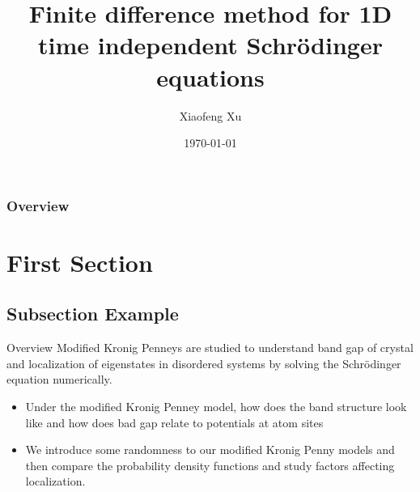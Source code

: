 \documentclass{beamer}
\title[Short title]{Finite difference method for 1D time independent Schr\"{o}dinger equations } %
\author{Xiaofeng Xu} %
\institute[HKUST] %
{
Hong Kong University of Science and Technology \\ %
\medskip
\textit{xxuam@connect.ust.hk} %
}
\date{\today} %
\begin{document}
\begin{frame}
\titlepage %
\end{frame}

\begin{frame}
\frametitle{Overview} %
\tableofcontents %
\end{frame}


\section{First Section} %

\subsection{Subsection Example} %
\begin{frame}{Overview}
Modified Kronig Penneys are studied to understand band gap of crystal and localization of eigenstates in disordered systems by solving the Schr\"{o}dinger equation numerically. 
\begin{itemize}
    \item Under the modified Kronig Penney model, how does the band structure look like and how does bad gap relate to potentials at atom sites
    \item We introduce some randomness to our modified Kronig Penny models and then compare the probability density functions and study factors affecting localization. 
\end{itemize}
\end{frame}
\end{document}
